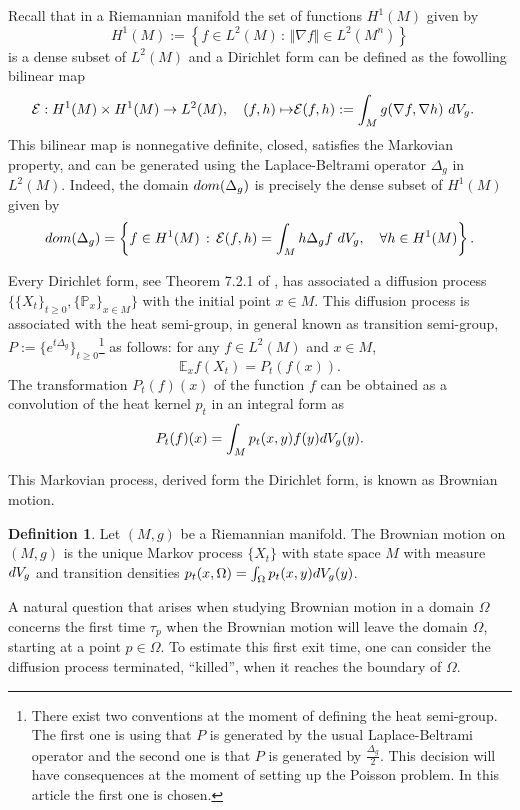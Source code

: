 \documentclass{amsart}
\theoremstyle{definition}
\newtheorem{definition}[theorem]{Definition}
\theoremstyle{remark}
\newcommand{\V}{{\rm V}}
\begin{document}
Recall that in a Riemannian manifold the set of functions $H^1(M)$  given by 
$$H^1(M):=\left\{ f\in L^2(M)\, :\, \Vert\nabla f\Vert\in L^2(M^n)\right\}$$ 
is a dense subset of $L^2(M)$ and a Dirichlet form can be defined as the fowolling bilinear map  
\begin{equation*}
\begin{aligned}
\mathcal{E}:H^1(M)\times H^1(M) \to L^2(M),\quad    (f,h)\mapsto& \mathcal{E}(f,h):=\int_M g(\nabla f, \nabla h)\ d\V_g.
\end{aligned}
\end{equation*}
This bilinear map is nonnegative definite, closed, satisfies the Markovian property, and can be generated using the Laplace-Beltrami operator $\Delta_g$ in $L^2(M)$. Indeed, the   domain ${\rm dom}(\Delta_g)$ is precisely the dense subset of $H^1(M)$ given by
$$
{\rm dom}(\Delta_g)=\left\{f\in H^1(M)\,:\,\mathcal{E}(f,h)=\int_M h\Delta_g f\ d\V_g,\quad \forall h\in H^1(M)\right\}.$$

Every Dirichlet form, see Theorem 7.2.1 of \cite{FukushimaOshimaTakeda+2010}, has  associated a diffusion process $\{\{X_t\}_{t\geq 0},\{\mathbb{P}_x\}_{x\in M }\}$  with the initial point $x\in M$. This  diffusion process is associated with the heat semi-group, in general known as transition semi-group, $P:= \{e^{t\Delta_g}\}_{t\geq 0}$\footnote{There exist two conventions at the moment of defining the heat semi-group. The first one is using that $P$ is generated by the usual Laplace-Beltrami operator and the second one is that $P$ is generated by $\frac{\Delta_g}{2}.$ This decision will have consequences at the moment of setting up the Poisson problem. In this article the first one is chosen. } as follows: for any $f\in L^2(M)$ and $x\in M$,
$$ \mathbb{E}_xf(X_t) = P_t(f(x)).$$
The transformation $P_t(f)(x)$ of the function $f$  can be obtained as a convolution of the heat kernel $p_t$ in an integral form as 
$$P_t(f)(x)= \int_M p_t(x,y)f(y)d\V_g(y).$$
 
This Markovian process, derived form the Dirichlet form, is known as Brownian motion.
\begin{definition}Let $(M,g)$ be a Riemannian manifold.
The Brownian motion on $(M,g)$ is the unique Markov process $\{X_t\}$ with state space $M$ with measure $d\V_g$ and transition densities $p_t(x,\Omega)= \int_{\Omega} p_t(x,y)d\V_g(y)$.
\end{definition}
A natural question that arises when studying Brownian motion in a domain $\Omega$ concerns the first time $\tau_p$ when the Brownian motion will leave the  domain $\Omega$, starting at a point $p \in \Omega$. To estimate this first exit time, one can consider the diffusion process terminated, ``killed'', when it  reaches the boundary of $\Omega$. 
\end{document}
